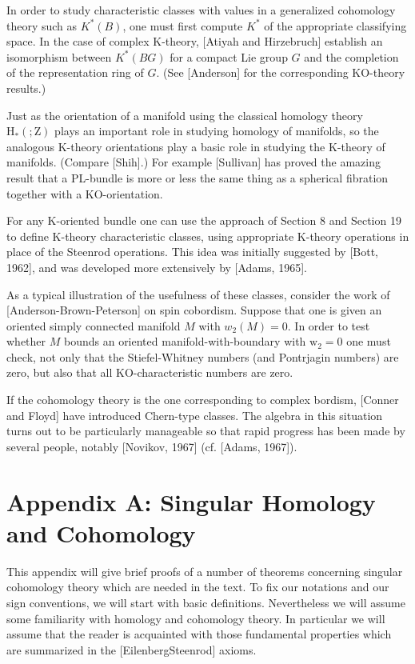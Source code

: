 \documentclass[10pt]{article}
\begin{document}
In order to study characteristic classes with values in a generalized cohomology theory such as $K^{*}(B)$, one must first compute $K^{*}$ of the appropriate classifying space. In the case of complex K-theory, [Atiyah and Hirzebruch] establish an isomorphism between $K^{*}(B G)$ for a compact Lie group $G$ and the completion of the representation ring of $G$. (See [Anderson] for the corresponding KO-theory results.)

Just as the orientation of a manifold using the classical homology theory $\mathrm{H}_{*}(; \mathrm{Z})$ plays an important role in studying homology of manifolds, so the analogous $\mathrm{K}$-theory orientations play a basic role in studying the $\mathrm{K}$-theory of manifolds. (Compare [Shih].) For example [Sullivan] has proved the amazing result that a PL-bundle is more or less the same thing as a spherical fibration together with a KO-orientation.

For any $\mathrm{K}$-oriented bundle one can use the approach of Section 8 and Section 19 to define $\mathrm{K}$-theory characteristic classes, using appropriate $\mathrm{K}$-theory operations in place of the Steenrod operations. This idea was initially suggested by [Bott, 1962], and was developed more extensively by [Adams, 1965].

As a typical illustration of the usefulness of these classes, consider the work of [Anderson-Brown-Peterson] on spin cobordism. Suppose that one is given an oriented simply connected manifold $M$ with $w_{2}(M)=0$. In order to test whether $M$ bounds an oriented manifold-with-boundary with $\mathrm{w}_{2}=0$ one must check, not only that the Stiefel-Whitney numbers (and Pontrjagin numbers) are zero, but also that all KO-characteristic numbers are zero.

If the cohomology theory is the one corresponding to complex bordism, [Conner and Floyd] have introduced Chern-type classes. The algebra in this situation turns out to be particularly manageable so that rapid progress has been made by several people, notably [Novikov, 1967] (cf. [Adams, 1967]).

\section{Appendix A: Singular Homology and Cohomology}
This appendix will give brief proofs of a number of theorems concerning singular cohomology theory which are needed in the text. To fix our notations and our sign conventions, we will start with basic definitions. Nevertheless we will assume some familiarity with homology and cohomology theory. In particular we will assume that the reader is acquainted with those fundamental properties which are summarized in the [EilenbergSteenrod] axioms.
\end{document}
